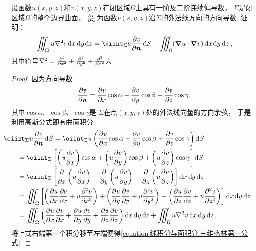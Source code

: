 \begin{example}[三维格林第一公式]
设函数\(u(x,y,z)\)和\(v(x,y,z)\)在闭区域\(\Omega\)上具有一阶及二阶连续偏导数，
\(\Sigma\)是闭区域\(\Omega\)的整个边界曲面，
\(\pdv{v}{\boldsymbol{n}}\)为函数\(v(x,y,z)\)沿\(\Sigma\)的外法线方向的方向导数.
证明：\begin{equation}\label{equation:线积分与面积分.三维格林第一公式}
	\iiint_\Omega u \laplacian{v} \dd{x}\dd{y}\dd{z}
	= \oiint_\Sigma u \pdv{v}{\vb{n}} \dd{S}
	- \iiint_\Omega (\VectorInnerProductDot{\grad u}{\grad v}) \dd{x}\dd{y}\dd{z},
\end{equation}
其中符号\(\laplacian = \pdv[2]{x} + \pdv[2]{y} + \pdv[2]{z}\)为.
\begin{proof}
因为方向导数\begin{equation*}
	\pdv{v}{\boldsymbol{n}}
	= \pdv{v}{x} \cos\alpha
	+ \pdv{v}{y} \cos\beta
	+ \pdv{v}{z} \cos\gamma,
\end{equation*}
其中\(\cos\alpha\)、\(\cos\beta\)、\(\cos\gamma\)是
\(\Sigma\)在点\((x,y,z)\)处的外法线向量的方向余弦，
于是利用高斯公式即有曲面积分\begin{align*}
	&\hspace{-20pt}\oiint_\Sigma u \pdv{v}{\vb{n}} \dd{S}
	= \oiint_\Sigma u \left(
			\pdv{v}{x} \cos\alpha
			+ \pdv{v}{y} \cos\beta
			+ \pdv{v}{z} \cos\gamma
		\right) \dd{S} \\
	&= \oiint_\Sigma \left[
			\left( u \pdv{v}{x} \right) \cos\alpha
			+ \left( u \pdv{v}{y} \right) \cos\beta
			+ \left( u \pdv{v}{z} \right) \cos\gamma
		\right] \dd{S} \\
	&= \oiint_\Sigma \left[
			\pdv{x} \left( u \pdv{v}{x} \right)
			+ \pdv{y} \left( u \pdv{v}{y} \right)
			+ \pdv{z} \left( u \pdv{v}{z} \right)
		\right] \dd{x}\dd{y}\dd{z} \\
	&= \iiint_\Omega \left[
			\left( \pdv{u}{x} \pdv{v}{x} + u \pdv[2]{v}{x} \right)
			+ \left( \pdv{u}{y} \pdv{v}{y} + u \pdv[2]{v}{y} \right)
			+ \left( \pdv{u}{z} \pdv{v}{z} + u \pdv[2]{v}{z} \right)
		\right] \dd{x}\dd{y}\dd{z} \\
	&= \iiint_\Omega \left(
			\pdv{u}{x} \pdv{v}{x}
			+ \pdv{u}{y} \pdv{v}{y}
			+ \pdv{u}{z} \pdv{v}{z}
		\right) \dd{x}\dd{y}\dd{z}
		+ \iiint_\Omega u \laplacian{v} \dd{x}\dd{y}\dd{z},
\end{align*}
将上式右端第一个积分移至左端便得\cref{equation:线积分与面积分.三维格林第一公式}.
\end{proof}
\end{example}

